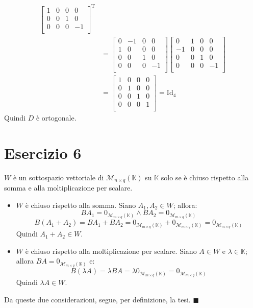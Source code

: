 \documentclass{article}
\newcommand*{\qed}{\blacksquare}
\newcommand*{\M}[3]{\mathcal{M}_{#1\times#2} \left(#3\right)}
\newcommand*{\MK}[2]{\M{#1}{#2}{\mathbb{K}}}
\begin{document}
\begin{enumerate}
\begin{equation*}
\begin{aligned}
\begin{bmatrix}
            1 & 0 & 0 & 0 \\
            0 & 0 & 1 & 0 \\
            0 & 0 & 0 & -1 \\
        \end{bmatrix}^\text{T} \\ &=
        \begin{bmatrix}
            0 & -1 & 0 & 0 \\
            1 & 0 & 0 & 0 \\
            0 & 0 & 1 & 0 \\
            0 & 0 & 0 & -1 \\
        \end{bmatrix}
        \begin{bmatrix}
            0 & 1 & 0 & 0 \\
            -1 & 0 & 0 & 0 \\
            0 & 0 & 1 & 0 \\
            0 & 0 & 0 & -1 \\
        \end{bmatrix} \\ &=
        \begin{bmatrix}
            1 & 0 & 0 & 0 \\
            0 & 1 & 0 & 0 \\
            0 & 0 & 1 & 0 \\
            0 & 0 & 0 & 1 \\
        \end{bmatrix} = \text{Id}_4
    \end{aligned}\end{equation*}
    Quindi $D$ è ortogonale.
\end{enumerate}

\section*{Esercizio 6}
$W$ è un sottospazio vettoriale di $\MK{n}{q}$ su $\mathbb{K}$ solo se
è chiuso rispetto alla somma e alla moltiplicazione per scalare.
\begin{itemize}
    \item $W$ è chiuso rispetto alla somma. Siano $A_1,A_2\in W$; allora:
    \[BA_1=0_{\MK{m}{q}} \wedge BA_2=0_{\MK{m}{q}}\]
    \[B(A_1 + A_2) = BA_1 + BA_2 = 0_{\MK{m}{q}} + 0_{\MK{m}{q}} = 0_{\MK{m}{q}}\]
    Quindi $A_1 + A_2 \in W$.
    \item $W$ è chiuso rispetto alla moltiplicazione per scalare.
    Siano $A\in W$ e $\lambda\in\mathbb{K}$; allora $BA=0_{\MK{m}{q}}$ e:
    \[B(\lambda A)=\lambda BA = \lambda 0_{\MK{m}{q}} = 0_{\MK{m}{q}}\]
    Quindi $\lambda A \in W$.
\end{itemize}
Da queste due considerazioni, segue, per definizione, la tesi. $\qed$
\end{document}
